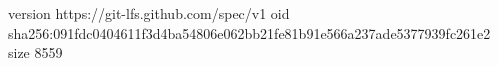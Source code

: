 version https://git-lfs.github.com/spec/v1
oid sha256:091fdc0404611f3d4ba54806e062bb21fe81b91e566a237ade5377939fc261e2
size 8559
